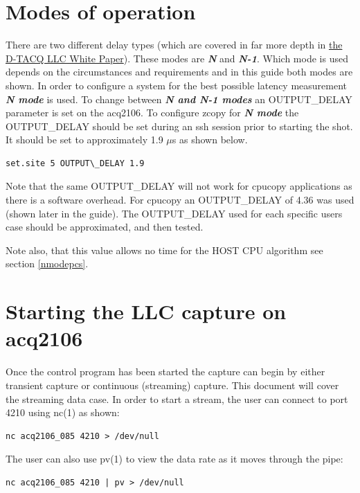 \documentclass{article}
\begin{document}
\section{Modes of operation} \label{modes}

There are two different delay types (which are covered in far more depth in \href{http://www.d-tacq.com/resources/LLC_White_Paper.pdf}{the \mbox{D-TACQ} LLC White Paper}).
These modes are \textit{\textbf{N}} and \textit{\textbf{N-1}}.
Which mode is used depends on the circumstances and requirements and in this guide both modes are shown.
In order to configure a system for the best possible latency measurement \textit{\textbf{N mode}} is used. To change between \textit{\textbf{N and N-1 modes}} an OUTPUT\_DELAY parameter is set on the acq2106.
To configure zcopy for \textit{\textbf{N mode}} the OUTPUT\_DELAY should be set during an ssh session prior to starting the shot.
It should be set to approximately 1.9 $\mu$s as shown below.

\begin{verbatim}
set.site 5 OUTPUT\_DELAY 1.9
\end{verbatim}

Note that the same OUTPUT\_DELAY will not work for cpucopy applications as there is a software overhead.
For cpucopy an OUTPUT\_DELAY of 4.36 was used (shown later in the guide).
The OUTPUT\_DELAY used for each specific users case should be approximated, and then tested.

Note also, that this value allows no time for the HOST CPU algorithm see section \ref{nmodepcs}.

\section{Starting the LLC capture on acq2106} \label{startingcap}
Once the control program has been started the capture can begin by either transient capture or continuous (streaming) capture.
This document will cover the streaming data case.
In order to start a stream, the user can connect to port 4210 using nc(1) as shown:

\begin{verbatim}
nc acq2106_085 4210 > /dev/null
\end{verbatim}

The user can also use pv(1) to view the data rate as it moves through the pipe:

\begin{verbatim}
nc acq2106_085 4210 | pv > /dev/null
\end{verbatim}
\end{document}
